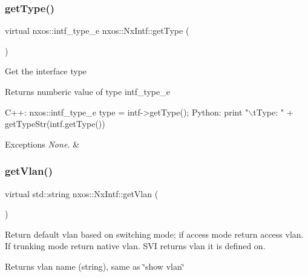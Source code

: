 \subsubsection{\texorpdfstring{get\+Type()}{getType()}}
{\footnotesize\ttfamily virtual nxos\+::intf\+\_\+type\+\_\+e nxos\+::\+Nx\+Intf\+::get\+Type (\begin{DoxyParamCaption}{ }\end{DoxyParamCaption})\hspace{0.3cm}{\ttfamily [pure virtual]}}

Get the interface type

\begin{DoxyReturn}{Returns}
numberic value of type intf\+\_\+type\+\_\+e
\end{DoxyReturn}

\begin{DoxyCode}
C++:
       nxos::intf\_type\_e   type = intf->getType();
Python:
       print \textcolor{stringliteral}{"\(\backslash\)tType: "} + getTypeStr(intf.getType())
\end{DoxyCode}



\begin{DoxyExceptions}{Exceptions}
{\em None.} & \\
\hline
\end{DoxyExceptions}
\mbox{\label{classnxos_1_1_nx_intf_a3f7942d5ae1a998904d9ea97b252eb21}} 
\subsubsection{\texorpdfstring{get\+Vlan()}{getVlan()}}
{\footnotesize\ttfamily virtual std\+::string nxos\+::\+Nx\+Intf\+::get\+Vlan (\begin{DoxyParamCaption}{ }\end{DoxyParamCaption})\hspace{0.3cm}{\ttfamily [pure virtual]}}

Return default vlan based on switching mode; if access mode return access vlan. If trunking mode return native vlan. S\+VI returns vlan it is defined on.

\begin{DoxyReturn}{Returns}
vlan name (string), same as \char`\"{}show vlan\char`\"{}
\end{DoxyReturn}

